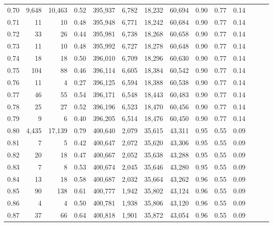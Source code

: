 \begin{tabular}{rrrrrrrrrrrrrr}
0.70 &   9,648 &  10,463 &  0.52 &  395,937 &    6,782 &  18,232 &  60,694 &  0.90 &  0.77 &      0.14 \\
0.71 &      11 &      10 &  0.48 &  395,948 &    6,771 &  18,242 &  60,684 &  0.90 &  0.77 &      0.14 \\
0.72 &      33 &      26 &  0.44 &  395,981 &    6,738 &  18,268 &  60,658 &  0.90 &  0.77 &      0.14 \\
0.73 &      11 &      10 &  0.48 &  395,992 &    6,727 &  18,278 &  60,648 &  0.90 &  0.77 &      0.14 \\
0.74 &      18 &      18 &  0.50 &  396,010 &    6,709 &  18,296 &  60,630 &  0.90 &  0.77 &      0.14 \\
0.75 &     104 &      88 &  0.46 &  396,114 &    6,605 &  18,384 &  60,542 &  0.90 &  0.77 &      0.14 \\
0.76 &      11 &       4 &  0.27 &  396,125 &    6,594 &  18,388 &  60,538 &  0.90 &  0.77 &      0.14 \\
0.77 &      46 &      55 &  0.54 &  396,171 &    6,548 &  18,443 &  60,483 &  0.90 &  0.77 &      0.14 \\
0.78 &      25 &      27 &  0.52 &  396,196 &    6,523 &  18,470 &  60,456 &  0.90 &  0.77 &      0.14 \\
0.79 &       9 &       6 &  0.40 &  396,205 &    6,514 &  18,476 &  60,450 &  0.90 &  0.77 &      0.14 \\
0.80 &   4,435 &  17,139 &  0.79 &  400,640 &    2,079 &  35,615 &  43,311 &  0.95 &  0.55 &      0.09 \\
0.81 &       7 &       5 &  0.42 &  400,647 &    2,072 &  35,620 &  43,306 &  0.95 &  0.55 &      0.09 \\
0.82 &      20 &      18 &  0.47 &  400,667 &    2,052 &  35,638 &  43,288 &  0.95 &  0.55 &      0.09 \\
0.83 &       7 &       8 &  0.53 &  400,674 &    2,045 &  35,646 &  43,280 &  0.95 &  0.55 &      0.09 \\
0.84 &      13 &      18 &  0.58 &  400,687 &    2,032 &  35,664 &  43,262 &  0.96 &  0.55 &      0.09 \\
0.85 &      90 &     138 &  0.61 &  400,777 &    1,942 &  35,802 &  43,124 &  0.96 &  0.55 &      0.09 \\
0.86 &       4 &       4 &  0.50 &  400,781 &    1,938 &  35,806 &  43,120 &  0.96 &  0.55 &      0.09 \\
0.87 &      37 &      66 &  0.64 &  400,818 &    1,901 &  35,872 &  43,054 &  0.96 &  0.55 &      0.09 \\

\end{tabular}
